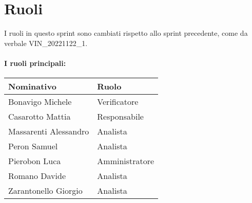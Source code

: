 \section{Ruoli}

I ruoli in questo sprint sono cambiati rispetto allo sprint precedente, come da verbale VIN_20221122_1.

\paragraph{I ruoli principali:}

\begin{center}
    \begin{tabularx}{\textwidth}{X l}
        
        \rowcolor{gray!30} \textbf{Nominativo} & \textbf{Ruolo}\\
        
        \hline

        Bonavigo Michele & Verificatore \\
        \rowcolor{gray!10}Casarotto Mattia & Responsabile \\
        Massarenti Alessandro & Analista \\
        \rowcolor{gray!10}Peron Samuel & Analista \\
        Pierobon Luca & Amministratore \\
        \rowcolor{gray!10}Romano Davide & Analista \\
        Zarantonello Giorgio & Analista \\

    \end{tabularx}
\end{center}
